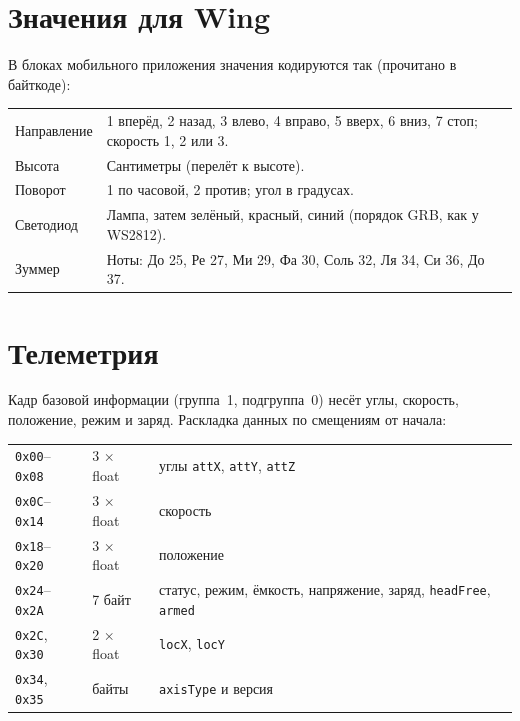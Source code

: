 \section{Значения для Wing}

В блоках мобильного приложения значения кодируются так (прочитано в байткоде):

\begin{tabularx}{\textwidth}{@{}l Y@{}}
\toprule
{} &  \\ \midrule
Направление & 1 вперёд, 2 назад, 3 влево, 4 вправо, 5 вверх, 6 вниз, 7 стоп; скорость 1, 2 или 3. \\
Высота & Сантиметры (перелёт к высоте). \\
Поворот & 1 по часовой, 2 против; угол в градусах. \\
Светодиод & Лампа, затем зелёный, красный, синий (порядок GRB, как у WS2812). \\
Зуммер & Ноты: До 25, Ре 27, Ми 29, Фа 30, Соль 32, Ля 34, Си 36, До 37. \\ \bottomrule
\end{tabularx}

\section{Телеметрия}

Кадр базовой информации (группа~1, подгруппа~0) несёт углы, скорость, положение, режим и заряд. Раскладка данных по смещениям от начала:

\begin{tabularx}{\textwidth}{@{}l l Y@{}}
\toprule
{} &  &  \\ \midrule
\texttt{0x00}--\texttt{0x08} & 3 $\times$ float & углы \texttt{attX}, \texttt{attY}, \texttt{attZ} \\
\texttt{0x0C}--\texttt{0x14} & 3 $\times$ float & скорость \\
\texttt{0x18}--\texttt{0x20} & 3 $\times$ float & положение \\
\texttt{0x24}--\texttt{0x2A} & 7 байт & статус, режим, ёмкость, напряжение, заряд, \texttt{headFree}, \texttt{armed} \\
\texttt{0x2C}, \texttt{0x30} & 2 $\times$ float & \texttt{locX}, \texttt{locY} \\
\texttt{0x34}, \texttt{0x35} & байты & \texttt{axisType} и версия \\ \bottomrule
\end{tabularx}

